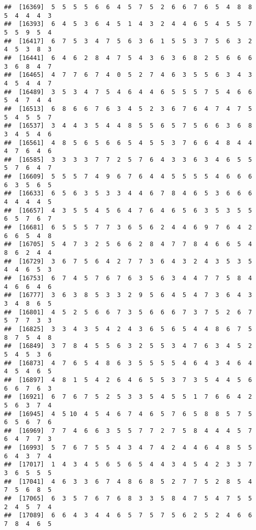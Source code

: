 \documentclass[
]{book}
\begin{document}
\begin{verbatim}
##  [16369]  5  5  5  5  6  6  4  5  7  5  2  6  6  7  6  5  4  8  8  5  4  4  4  3
##  [16393]  6  4  5  3  6  4  5  1  4  3  2  4  4  6  5  4  5  5  7  5  5  9  5  4
##  [16417]  6  7  5  3  4  7  5  6  3  6  1  5  5  3  7  5  6  3  2  4  5  3  8  3
##  [16441]  6  4  6  2  8  4  7  5  4  3  6  3  6  8  2  5  6  6  6  3  6  8  4  7
##  [16465]  4  7  7  6  7  4  0  5  2  7  4  6  3  5  5  6  3  4  3  4  5  4  4  7
##  [16489]  3  5  3  4  7  5  4  6  4  4  6  5  5  5  7  5  4  6  6  5  4  7  4  4
##  [16513]  6  8  6  6  7  6  3  4  5  2  3  6  7  6  4  7  4  7  5  5  4  5  5  7
##  [16537]  3  4  4  3  5  4  4  8  5  5  6  5  7  5  6  6  3  6  8  3  4  5  4  6
##  [16561]  4  8  5  6  5  6  6  5  4  5  5  3  7  6  6  4  8  4  4  4  7  6  4  6
##  [16585]  3  3  3  3  7  7  2  5  7  6  4  3  3  6  3  4  6  5  5  5  7  6  4  7
##  [16609]  5  5  5  7  4  9  6  7  6  4  4  5  5  5  5  4  6  6  6  6  3  5  6  5
##  [16633]  6  5  6  3  5  3  3  4  4  6  7  8  4  6  5  3  6  6  6  4  4  4  4  5
##  [16657]  4  3  5  5  4  5  6  4  7  6  4  6  5  6  3  5  3  5  5  6  5  7  6  7
##  [16681]  6  5  5  5  7  7  3  6  5  6  2  4  4  6  9  7  6  4  2  6  6  5  4  8
##  [16705]  5  4  7  3  2  5  6  6  2  8  4  7  7  8  4  6  6  5  4  8  6  2  4  4
##  [16729]  3  6  7  5  6  4  2  7  7  3  6  4  3  2  4  3  5  3  5  4  4  6  5  3
##  [16753]  6  7  4  5  7  6  7  6  3  5  6  3  4  4  7  7  5  8  4  4  6  6  4  6
##  [16777]  3  6  3  8  5  3  3  2  9  5  6  4  5  4  7  3  6  4  3  3  4  8  6  5
##  [16801]  4  5  2  5  6  6  7  3  5  6  6  6  7  3  7  5  2  6  7  5  7  7  3  3
##  [16825]  3  3  4  3  5  4  2  4  3  6  5  6  5  4  4  8  6  7  5  8  7  5  4  8
##  [16849]  3  7  8  4  5  5  6  3  2  5  5  3  4  7  6  3  4  5  2  5  4  5  3  6
##  [16873]  4  7  6  5  4  8  6  3  5  5  5  5  4  6  4  3  4  6  4  4  5  4  6  5
##  [16897]  4  8  1  5  4  2  6  4  6  5  5  3  7  3  5  4  4  5  6  6  6  7  6  3
##  [16921]  6  7  6  7  5  2  5  3  3  5  4  5  5  1  7  6  6  4  2  5  6  3  7  4
##  [16945]  4  5 10  4  5  4  6  7  4  6  5  7  6  5  8  8  5  7  5  6  5  6  7  6
##  [16969]  7  7  4  6  6  3  5  5  7  7  2  7  5  8  4  4  4  5  7  6  4  7  7  3
##  [16993]  5  7  6  7  5  5  4  3  4  7  4  2  4  4  6  4  8  5  5  6  4  3  7  4
##  [17017]  1  4  3  4  5  6  5  6  5  4  4  3  4  5  4  2  3  3  7  3  6  5  5  5
##  [17041]  4  6  3  3  6  7  4  8  6  8  5  2  7  7  5  2  8  5  4  7  5  6  8  5
##  [17065]  6  3  5  7  6  7  6  8  3  3  5  8  4  7  5  4  7  5  5  2  4  5  7  4
##  [17089]  6  6  4  3  4  4  6  5  7  5  7  5  6  2  5  2  4  6  6  7  8  4  6  5

\end{verbatim}
\end{document}
